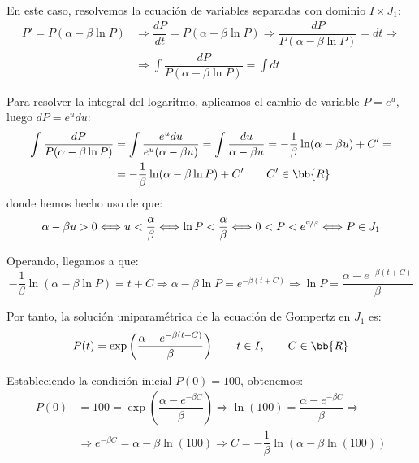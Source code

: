 \begin{ejercicio}
\begin{itemize}
        En este caso, resolvemos la ecuación de variables separadas con dominio $I\times J_1$:
        \begin{align*}
            P' = P(\alpha - \beta \ln P) &\Longrightarrow \dfrac{dP}{dt} = P(\alpha - \beta \ln P) \Longrightarrow \dfrac{dP}{P(\alpha - \beta \ln P)} = dt \Longrightarrow \\ &\Longrightarrow \int \dfrac{dP}{P(\alpha - \beta \ln P)} = \int dt
        \end{align*}

        Para resolver la integral del logaritmo, aplicamos el cambio de variable $P=e^u$, luego $dP=e^u du$:
        \begin{align*}
            \int \dfrac{dP}{P(\alpha - \beta \ln P)} &= \int \dfrac{e^u du}{e^u(\alpha - \beta u)} = \int \dfrac{du}{\alpha - \beta u}
            = -\dfrac{1}{\beta} \ln(\alpha - \beta u) + C' =\\
            &= -\dfrac{1}{\beta} \ln(\alpha - \beta \ln P) + C' \qquad C'\in \bb{R}
        \end{align*}
        donde hemos hecho uso de que:
        \begin{equation*}
            \alpha-\beta u>0\Longleftrightarrow
            u<\dfrac{\alpha}{\beta}\Longleftrightarrow
            \ln P<\dfrac{\alpha}{\beta}\Longleftrightarrow
            0<P<e^{\nicefrac{\alpha}{\beta}} \Longleftrightarrow P\in J_1
        \end{equation*}

        Operando, llegamos a que:
        \begin{equation*}
            -\dfrac{1}{\beta} \ln(\alpha - \beta \ln P) = t + C \Longrightarrow \alpha - \beta \ln P = e^{-\beta(t + C)} \Longrightarrow \ln P = \dfrac{\alpha - e^{-\beta(t + C)}}{\beta}
        \end{equation*}

        Por tanto, la solución uniparamétrica de la ecuación de Gompertz en $J_1$ es:
        \begin{equation*}
            P(t) = \exp\left(\dfrac{\alpha - e^{-\beta(t + C)}}{\beta}\right) \qquad t\in I,\qquad C\in \bb{R}
        \end{equation*}

        Estableciendo la condición inicial $P(0)=100$, obtenemos:
        \begin{align*}
            P(0) &= 100 = \exp\left(\dfrac{\alpha - e^{-\beta C}}{\beta}\right) \Longrightarrow \ln(100) = \dfrac{\alpha - e^{-\beta C}}{\beta} \Longrightarrow \\ &\Longrightarrow e^{-\beta C} = \alpha-\beta\ln(100) \Longrightarrow C=-\dfrac{1}{\beta}\ln(\alpha-\beta\ln(100))
        \end{align*}


\end{itemize}
\end{ejercicio}
